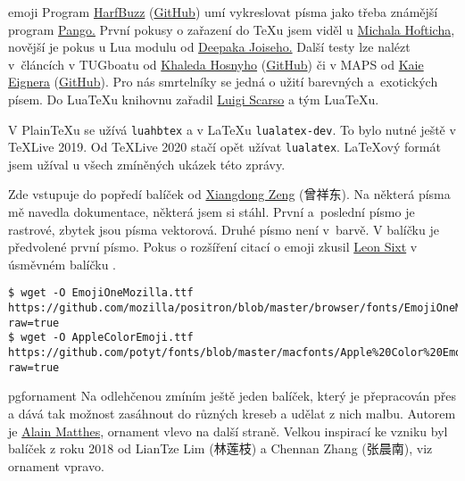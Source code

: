 \pis emoji
Program 
\href{https://www.freedesktop.org/wiki/Software/HarfBuzz/}{HarfBuzz} (\href{https://harfbuzz.github.io/}{GitHub}) umí vykreslovat písma jako třeba známější program 
\href{https://developer.gnome.org/pango/stable/pango-Fonts.html}{Pango.}
První pokusy o zařazení do \TeX u jsem viděl u \href{https://github.com/michal-h21/luatex-harfbuzz-shaper}{Michala Hofticha}, novější je pokus u Lua modulu od 
\href{https://github.com/ufyTeX/luaharfbuzz}{Deepaka Joiseho.}
Další testy lze nalézt v~článcích v TUGboatu od 
\href{https://tug.org/TUGboat/tb40-1/tb124hosny-harfbuzz.pdf}{Khaleda Hosnyho} (\href{https://github.com/khaledhosny}{GitHub}) či 
v MAPS od 
\href{http://www.ntg.nl/maps/47/02.pdf}{Kaie Eignera} (\href{https://github.com/tatzetwerk/luatex-harfbuzz}{GitHub}). Pro nás smrtelníky se jedná o užití barevných a~exotických písem. Do Lua\TeX u knihovnu zařadil 
\href{https://ctan.org/author/scarso}{Luigi Scarso} a tým Lua\TeX u.

V Plain\TeX u se užívá \texttt{luahbtex} a v \LaTeX u \texttt{lualatex-dev}. To bylo nutné ještě v \TeX Live 2019. Od \TeX Live 2020 stačí opět užívat \texttt{lualatex}.
\LaTeX ový formát jsem užíval u všech zmíněných ukázek této zprávy. 

Zde vstupuje do popředí balíček  od 
\href{https://github.com/stone-zeng}{Xiangdong Zeng} ({\malcjkv 曾祥东}). Na některá písma mě navedla dokumentace, některá jsem si stáhl. 
První a~poslední písmo je rastrové, zbytek jsou písma vektorová. Druhé písmo není v~barvě. V balíčku je předvolené první písmo.
Pokus o rozšíření citací o emoji zkusil  
\href{https://ctan.org/author/sixt-l}{Leon Sixt} v úsměvném balíčku .

\begin{lstlisting}[breakatwhitespace=false]
$ wget -O EmojiOneMozilla.ttf https://github.com/mozilla/positron/blob/master/browser/fonts/EmojiOneMozilla.ttf?raw=true
$ wget -O AppleColorEmoji.ttf https://github.com/potyt/fonts/blob/master/macfonts/Apple%20Color%20Emoji/Apple%20Color%20Emoji.ttf?raw=true
\end{lstlisting}
\kod


\pis pgfornament
Na odlehčenou zmíním ještě jeden balíček, který je přepracován přes \maltikz{} a dává tak možnost zasáhnout do různých kreseb a udělat z nich malbu. Autorem je 
\href{https://ctan.org/author/matthes}{Alain Matthes}, ornament vlevo na další straně.
Velkou inspirací ke vzniku byl balíček  z roku 2018 od 
LianTze Lim ({\malcjkv 林莲枝}) a Chennan Zhang ({\malcjkv 张晨南}), viz ornament vpravo.
\kod


